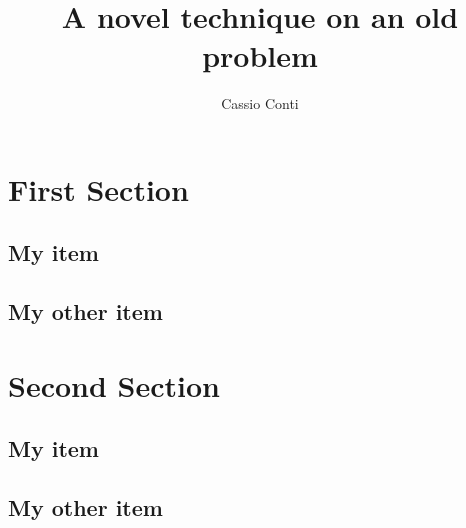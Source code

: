\documentclass[letterpaper]{article}
\title{A novel technique on an old problem}
\author{Cassio Conti}
\date{}
\begin{document}
\maketitle


\begin{abstract}
    \blindtext
\end{abstract}

\section{First Section}

\subsection{My item}

\blindtext

\subsection{My other item}

\blindtext

\section{Second Section}

\subsection{My item}

\blindtext

\blindtext

\subsection{My other item}

\blindtext

% 
% 
\end{document}
